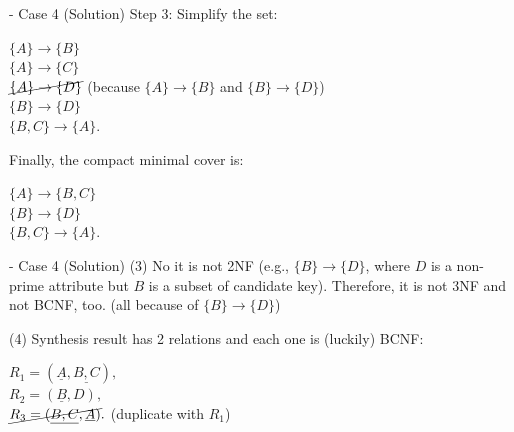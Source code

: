 \begin{frame}[fragile]{ - Case 4 (Solution)}
	Step 3: Simplify the set:\\\vspace{5pt}
	
	$\{A\} \rightarrow \{B\}$\\
	$\{A\} \rightarrow \{C\}$\\
	$\cancel{\{A\} \rightarrow \{D\}}$ (because $\{A\} \rightarrow \{B\}$ and $\{B\} \rightarrow \{D\}$)\\
	$\{B\} \rightarrow \{D\}$\\
	$\{B, C\} \rightarrow \{A\}$.\\\vspace{5pt}
	
	Finally, the compact minimal cover is:\\\vspace{5pt}
	
	$\{A\} \rightarrow \{B, C\}$\\
	$\{B\} \rightarrow \{D\}$\\
	$\{B, C\} \rightarrow \{A\}$.\\\vspace{5pt}
	
\end{frame}

\begin{frame}[fragile]{ - Case 4 (Solution)}
	(3) No it is not 2NF (e.g., $\{B\} \rightarrow \{D\}$, where $D$ is a non-prime attribute but $B$ is a subset of candidate key). Therefore, it is not 3NF and not BCNF, too. (all because of $\{B\} \rightarrow \{D\}$)\\\vspace{5pt}
	
	(4) Synthesis result has 2 relations and each one is (luckily) BCNF: \\\vspace{5pt}
	
	$R_1 = (\underline{A}, \underline{B, C}),$\\\vspace{2pt}
	$R_2 = (\underline{B}, D),$\\\vspace{1pt}
	$\cancel{R_3 = (\underline{B, C}, \underline{A})}.$ (duplicate with $R_1$)\\\vspace{5pt}
	
\end{frame}

